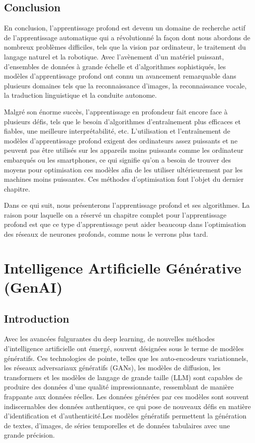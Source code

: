 \section{Conclusion}
En conclusion, l'apprentissage profond est devenu un domaine de recherche actif
de l'apprentissage automatique qui a révolutionné la façon dont nous abordons
de nombreux problèmes difficiles, tels que la vision par ordinateur, le
traitement du langage naturel et la robotique. Avec l'avènement d'un matériel
puissant, d'ensembles de données à grande échelle et d'algorithmes
sophistiqués, les modèles d'apprentissage profond ont connu un avancement
remarquable dans plusieurs domaines tels que la reconnaissance d'images, la
reconnaissance vocale, la traduction linguistique et la conduite autonome.

\medskip
Malgré son énorme succès, l'apprentissage en profondeur fait encore face à plusieurs défis, tels que le besoin d'algorithmes d'entraînement plus efficaces et fiables, une meilleure interprétabilité, etc. L’utilisation et l'entraînement de modèles d’apprentissage profond exigent des ordinateurs assez puissants et ne peuvent pas être utilisés sur les appareils moins puissants comme les ordinateur embarqués ou les smartphones, ce qui signifie qu'on a besoin de trouver des moyens pour optimisation ces modèles afin de les utiliser ultérieurement par les machines moins puissantes. Ces méthodes d'optimisation font l'objet du dernier chapitre.

\medskip
Dans ce qui suit, nous présenterons l'apprentissage profond et ses algorithmes. La raison pour laquelle on a réservé un chapitre complet pour l'apprentissage profond est que ce type d'apprentissage peut aider beaucoup dans l'optimisation des réseaux de neurones profonds, comme nous le verrons plus tard.

\clearpage


\chapter{Intelligence Artificielle Générative (GenAI)}
\section{Introduction}

Avec les avancées fulgurantes du deep learning, de nouvelles méthodes
d'intelligence artificielle ont émergé, souvent désignées sous le terme de
modèles génératifs. Ces technologies de pointe, telles que les auto-encodeurs
variationnels, les réseaux adversariaux génératifs (GANs), les modèles de
diffusion, les transformers et les modèles de langage de grande taille (LLM)
sont capables de produire des données d'une qualité impressionnante,
ressemblant de manière frappante aux données réelles. Les données générées par
ces modèles sont souvent indiscernables des données authentiques, ce qui pose
de nouveaux défis en matière d'identification et d'authenticité.Les modèles
génératifs permettent la génération de textes, d'images, de séries temporelles
et de données tabulaires avec une grande précision.


